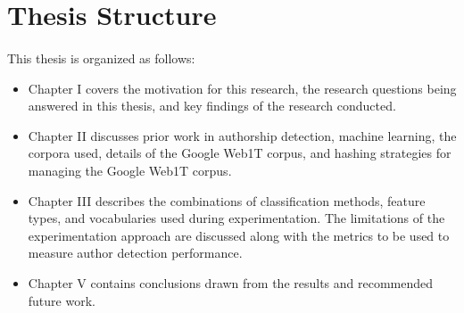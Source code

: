 \section{Thesis Structure}
\paragraph*{} This thesis is organized as follows:
\begin{itemize}
\item Chapter I covers the motivation for this research, the research questions being answered in this thesis, and key findings of the research conducted.
\item Chapter II discusses prior work in authorship detection, machine learning, the corpora used, details of the Google Web1T corpus, and hashing strategies for managing the Google Web1T corpus.
\item Chapter III describes the combinations of classification methods, feature types, and vocabularies used during experimentation.  The limitations of the experimentation approach are discussed along with the metrics to be used to measure author detection performance.
\item Chapter V contains conclusions drawn from the results and recommended future work.
\end{itemize}

